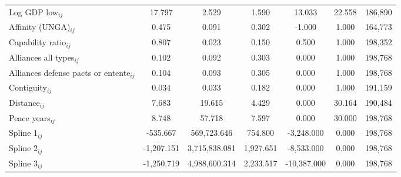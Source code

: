 \begin{table}[htbp]
\begin{tabular}{l*{1}{cccccc}}
Log GDP low$_{ij}$    &      17.797&       2.529&       1.590&      13.033&      22.558&      186,890\\
Affinity (UNGA)$_{ij}$    &       0.475&       0.091&       0.302&      -1.000&       1.000&      164,773\\
Capability ratio$_{ij}$    &       0.807&       0.023&       0.150&       0.500&       1.000&      198,352\\
Alliances all types$_{ij}$   &       0.102&       0.092&       0.303&       0.000&       1.000&      198,768\\
Alliances defense pacts or entente$_{ij}$    &       0.104&       0.093&       0.305&       0.000&       1.000&      198,768\\
Contiguity$_{ij}$   &       0.034&       0.033&       0.182&       0.000&       1.000&      191,159\\
Distance$_{ij}$ &       7.683&      19.615&       4.429&       0.000&      30.164&      190,484\\
Peace years$_{ij}$    &       8.748&      57.718&       7.597&       0.000&      30.000&      198,768\\
Spline 1$_{ij}$    &    -535.667&  569,723.646&     754.800&   -3,248.000&       0.000&      198,768\\
Spline 2$_{ij}$    &   -1,207.151& 3,715,838.081&    1,927.651&   -8,533.000&       0.000&      198,768\\
Spline 3$_{ij}$    &   -1,250.719& 4,988,600.314&    2,233.517&  -10,387.000&       0.000&      198,768\\
\bottomrule
\end{tabular}
\end{table}
